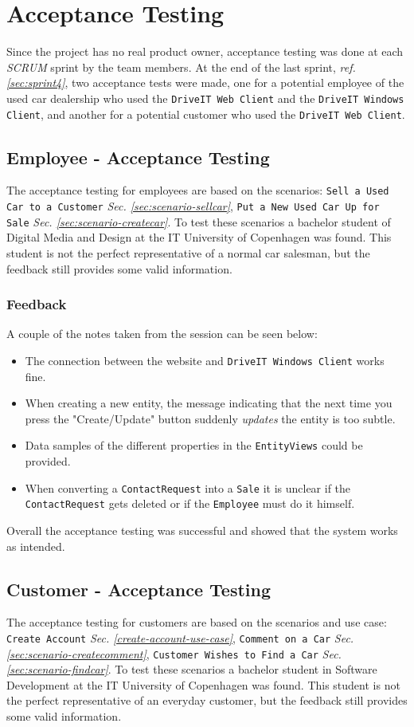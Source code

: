 \section{Acceptance Testing}
Since the project has no real product owner, acceptance testing was done at each \textit{SCRUM} sprint by the team members. At the end of the last sprint, \textit{ref. \ref{sec:sprint4}}, two acceptance tests were made, one for a potential employee of the used car dealership who used the \texttt{DriveIT Web Client} and the \texttt{DriveIT Windows Client}, and another for a potential customer who used the \texttt{DriveIT Web Client}.

\subsection{Employee - Acceptance Testing}
The acceptance testing for employees are based on the scenarios: \texttt{Sell a Used Car to a Customer} \textit{Sec. \ref{sec:scenario-sellcar}}, \texttt{Put a New Used Car Up for Sale} \textit{Sec. \ref{sec:scenario-createcar}}. To test these scenarios a bachelor student of Digital Media and Design at the IT University of Copenhagen was found. This student is not the perfect representative of a normal car salesman, but the feedback still provides some valid information.
\subsubsection{Feedback}
A couple of the notes taken from the session can be seen below:
\begin{itemize}
	\item The connection between the website and \texttt{DriveIT Windows Client} works fine.
	\item When creating a new entity, the message indicating that the next time you press the "Create/Update" button suddenly \textit{updates} the entity is too subtle.
	\item Data samples of the different properties in the \texttt{EntityViews} could be provided.
	\item When converting a \texttt{ContactRequest} into a \texttt{Sale} it is unclear if the \texttt{ContactRequest} gets deleted or if the \texttt{Employee} must do it himself.
\end{itemize}
Overall the acceptance testing was successful and showed that the system works as intended.
\subsection{Customer - Acceptance Testing}
The acceptance testing for customers are based on the scenarios and use case: \texttt{Create Account} \textit{Sec. \ref{create-account-use-case}}, \texttt{Comment on a Car} \textit{Sec. \ref{sec:scenario-createcomment}}, \texttt{Customer Wishes to Find a Car} \textit{Sec. \ref{sec:scenario-findcar}}. To test these scenarios a bachelor student in Software Development at the IT University of Copenhagen was found. This student is not the perfect representative of an everyday customer, but the feedback still provides some valid information.
